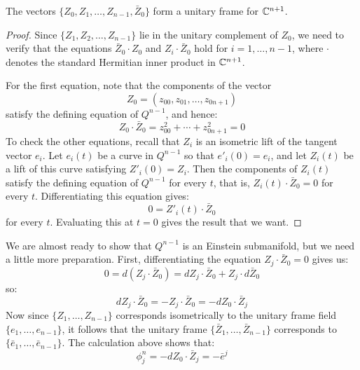 \begin{lem} The vectors $\{ Z_0, Z_1, \ldots, Z_{n-1}, \bar{Z}_0 \}$ form a unitary frame for $\mathbb{C}^{n+1}$.
\end{lem}

\begin{proof}  Since $\{ Z_1, Z_2, \ldots, Z_{n-1} \}$ lie in the unitary complement of $Z_0$, we need to verify that the equations $\bar{Z}_0 \cdot Z_0$ and $Z_i \cdot \bar{Z}_0$ hold for $i=1, \ldots, n-1$, where $\cdot$ denotes the standard Hermitian inner product in $\mathbb{C}^{n+1}$.

For the first equation, note that the components of the vector 
%
$$Z_0 = (z_{00}, z_{01}, \ldots, z_{0 n+1 })$$
%
satisfy the defining equation of $Q^{n-1}$, and hence:
%
$$ Z_0 \cdot \bar{Z}_0 = z_{00}^2 + \cdots + z_{0 n+1}^2 = 0 $$
%
To check the other equations, recall that $Z_i$ is an isometric lift of the tangent vector $e_i$.  Let $e_i(t)$ be a curve in $Q^{n-1}$ so that $e'_i(0) = e_i$, and let $Z_i(t)$ be a lift of this curve satisfying $Z'_i(0) = Z_i$.  Then the components of $Z_i(t)$ satisfy the defining equation of $Q^{n-1}$ for every $t$, that is, $Z_i(t) \cdot \bar{Z}_0 = 0$ for every $t$.  Differentiating this equation gives:
%
$$ 0 = Z'_i(t) \cdot \bar{Z}_0 $$
%
for every $t$.  Evaluating this at $t=0$ gives the result that we want.
\end{proof}

We are almost ready to show that $Q^{n-1}$ is an Einstein submanifold, but we need a little more preparation.  First, differentiating the equation $Z_j \cdot \bar{Z}_0 = 0$ gives us:
%
$$ 0 = d( Z_j \cdot \bar{Z}_0 ) = d Z_j \cdot \bar{Z}_0 + Z_j \cdot d \bar{Z}_0 $$
%
so:
%
$$ d Z_j \cdot \bar{Z}_0 = - Z_j \cdot \bar{Z}_0 = - d Z_0 \cdot \bar{Z}_j $$
%
Now since $\{ Z_1, \ldots, Z_{n-1 } \}$ corresponds isometrically to the unitary frame field $\{ e_1, \ldots, e_{n-1} \}$, it follows that the unitary frame $\{ \bar{Z}_1, \ldots, \bar{Z}_{n-1} \}$ corresponds to $\{ \bar{e}_1, \ldots, \bar{e}_{n-1} \}$.  The calculation above shows that:
%
$$ \phi^{n}_j = - d Z_0 \cdot \bar{Z}_j = - \bar{e}^j $$ 

